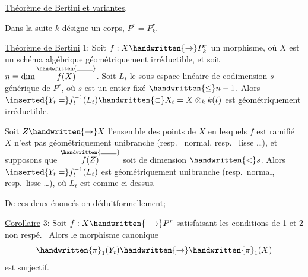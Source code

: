 
\uline{Théorème de Bertini et variantes}.

Dans la suite $k$ désigne un corps, $P^r=P^r_k$.

\uline{Théorème de Bertini} 1: Soit $f:X\handwritten{\rightarrow}P^r_k$ un morphisme, où $X$ est un schéma algébrique géométriquement irréductible, et soit $n=\dim\overset{\handwritten{\rule{1.9em}{.4pt}}}{f(X)}$. Soit $L_t$ le sous-espace linéaire de codimension $s$ \uline{générique} de $P^r$, où $s$ est un entier fixé $\handwritten{\leq}n-1$. Alors $\inserted{Y_t=}f_t^{-1}(L_t)\handwritten{\subset}X_t=X\otimes_k k(t)$ est géométriquement irréductible.

  Soit $Z\handwritten{\rightarrow}X$  l'ensemble des points de $X$ en lesquels  $f$ est  ramifié   $X$ n'est pas géométriquement unibranche (resp.\  normal, resp.\  lisse \ldots),  et supposons que $\overset{\handwritten{\rule{1.9em}{.4pt}}}{f(Z)}$ soit de dimension $\handwritten{<}s$. Alors $\inserted{Y_t=}f_t^{-1}(L_t)$ est géométriquement unibranche (resp.\ normal, resp.\ lisse \ldots), où $L_t$ est comme ci-dessus.

De ces deux énoncés on déduit\handwritten{/}formellement;

\uline{Corollaire} 3: Soit $f:X\handwritten{\longrightarrow}P^r$ satisfaisant les conditions de 1\handwritten{,} et 2 non respé.\  Alors le morphisme canonique
\[
\handwritten{\pi}_1(Y_{\bar{t}})\handwritten{\rightarrow}\handwritten{\pi}_1(X)
\]
est surjectif.

